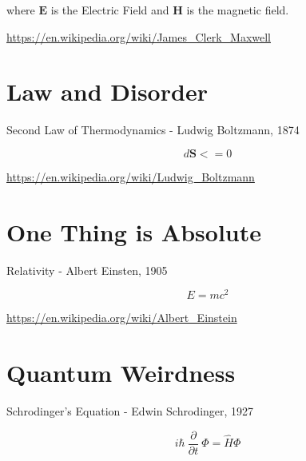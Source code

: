 \documentclass[12pt]{article}
\begin{document}
where $ \mathbf{E}$ is the Electric Field and $\mathbf{H}$ is the magnetic field.

\vspace{2em}

\url{https://en.wikipedia.org/wiki/James_Clerk_Maxwell}

\newpage


\section{Law and Disorder}

Second Law of Thermodynamics - Ludwig Boltzmann, 1874

\vspace{2em}

\begin{equation*}  d \mathbf{S} <= 0  \end{equation*}

\vspace{2em}

\url{https://en.wikipedia.org/wiki/Ludwig_Boltzmann}

\newpage


\section{One Thing is Absolute}

Relativity - Albert Einsten, 1905

\vspace{2em}

\begin{equation*}E=mc^2 \end{equation*}

\vspace{2em}

\url{https://en.wikipedia.org/wiki/Albert_Einstein}

\newpage


\section{Quantum Weirdness}

Schrodinger's Equation - Edwin  Schrodinger, 1927

\vspace{2em}

\begin{equation*}   i \hbar \  \frac{\partial}{\partial{t}} \  \Phi = \hat{H} \Phi \end{equation*}
\end{document}
